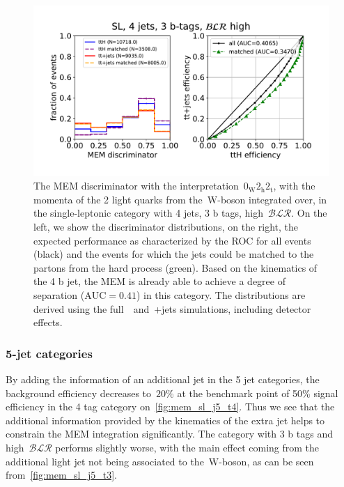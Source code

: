 \begin{figure}
\begin{centering}
\includegraphics[width = 1.0\textwidth]{figures/mem_sl_j4_t3_blrH.pdf}
\caption[The MEM discriminator with the~$0_{\mathrm{W}} 2_{\mathrm{h}} 2_{\mathrm{t}}$ interpretation in the 4~jet, 3~b-tag, high~$\mathcal{BLR}$ category]{The MEM discriminator with the interpretation~$0_{\mathrm{W}} 2_{\mathrm{h}} 2_{\mathrm{t}}$, with the momenta of the 2 light quarks from the~$\mathrm{W}$-boson integrated over, in the single-leptonic category with 4 jets, 3 b tags, high~$\mathcal{BLR}$. On the left, we show the discriminator distributions, on the right, the expected performance as characterized by the ROC for all events (black) and the events for which the jets could be matched to the partons from the hard process (green). Based on the kinematics of the 4 b jet, the MEM is already able to achieve a degree of separation ($\mathrm{AUC} = 0.41$) in this category. The distributions are derived using the full~\ttHbb~and~\ttbar+jets simulations, including detector effects.}
\label{fig:mem_sl_j4_t3}
\end{centering}
\end{figure}

\subsubsection{5-jet categories}
By adding the information of an additional jet in the 5 jet categories, the background efficiency decreases to~$20\%$ at the benchmark point of 50\% signal efficiency in the 4 tag category on~\cref{fig:mem_sl_j5_t4}. Thus we see that the additional information provided by the kinematics of the extra jet helps to constrain the MEM integration significantly. The category with 3 b tags and high~$\mathcal{BLR}$ performs slightly worse, with the main effect coming from the additional light jet not being associated to the~$\mathrm{W}$-boson, as can be seen from~\cref{fig:mem_sl_j5_t3}.

